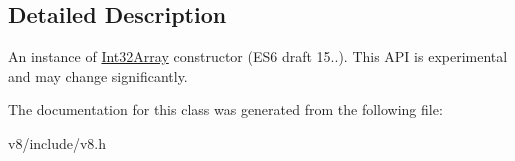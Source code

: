 \subsection{Detailed Description}
An instance of \hyperlink{classv8_1_1Int32Array}{Int32\-Array} constructor (E\-S6 draft 15..). This A\-P\-I is experimental and may change significantly. 

The documentation for this class was generated from the following file\-:\begin{DoxyCompactItemize}
\item 
v8/include/v8.\-h\end{DoxyCompactItemize}
